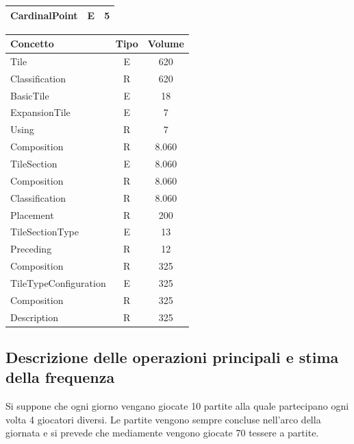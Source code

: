 {\begin{tabular}{ |l|c|c| }
CardinalPoint & E & 5 \\
\hline
\end{tabular}
\begin{tabular}{ |l|c|c| }
\hline
\textbf{Concetto} & \textbf{Tipo} & \textbf{Volume} \\
\hline
Tile & E & 620 \\
Classification & R & 620 \\
BasicTile & E & 18 \\
ExpansionTile & E & 7 \\
Using & R & 7 \\
Composition & R & 8.060 \\
\hline
TileSection & E & 8.060 \\
Composition & R & 8.060 \\
Classification & R & 8.060 \\
Placement & R & 200 \\
TileSectionType & E & 13 \\
Preceding & R & 12 \\
Composition & R & 325 \\
\hline
TileTypeConfiguration & E & 325 \\
Composition & R & 325 \\
Description & R & 325 \\
\hline
\end{tabular}}

\subsection{Descrizione delle operazioni principali e stima della frequenza}
Si suppone che ogni giorno vengano giocate 10 partite alla quale partecipano ogni volta 4 giocatori diversi. Le partite vengono sempre concluse nell'arco della giornata e si prevede che mediamente vengono giocate 70 tessere a partite.
\medskip

